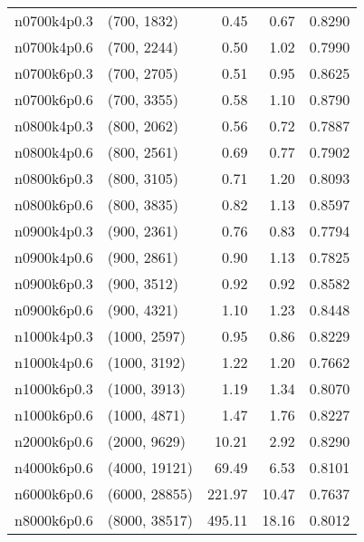 \begin{tabular}{llrrr}
n0700k4p0.3 &   (700, 1832) &      0.45 &     0.67 & 0.8290 \\
n0700k4p0.6 &   (700, 2244) &      0.50 &     1.02 & 0.7990 \\
n0700k6p0.3 &   (700, 2705) &      0.51 &     0.95 & 0.8625 \\
n0700k6p0.6 &   (700, 3355) &      0.58 &     1.10 & 0.8790 \\
n0800k4p0.3 &   (800, 2062) &      0.56 &     0.72 & 0.7887 \\
n0800k4p0.6 &   (800, 2561) &      0.69 &     0.77 & 0.7902 \\
n0800k6p0.3 &   (800, 3105) &      0.71 &     1.20 & 0.8093 \\
n0800k6p0.6 &   (800, 3835) &      0.82 &     1.13 & 0.8597 \\
n0900k4p0.3 &   (900, 2361) &      0.76 &     0.83 & 0.7794 \\
n0900k4p0.6 &   (900, 2861) &      0.90 &     1.13 & 0.7825 \\
n0900k6p0.3 &   (900, 3512) &      0.92 &     0.92 & 0.8582 \\
n0900k6p0.6 &   (900, 4321) &      1.10 &     1.23 & 0.8448 \\
n1000k4p0.3 &  (1000, 2597) &      0.95 &     0.86 & 0.8229 \\
n1000k4p0.6 &  (1000, 3192) &      1.22 &     1.20 & 0.7662 \\
n1000k6p0.3 &  (1000, 3913) &      1.19 &     1.34 & 0.8070 \\
n1000k6p0.6 &  (1000, 4871) &      1.47 &     1.76 & 0.8227 \\
n2000k6p0.6 &  (2000, 9629) &     10.21 &     2.92 & 0.8290 \\
n4000k6p0.6 & (4000, 19121) &     69.49 &     6.53 & 0.8101 \\
n6000k6p0.6 & (6000, 28855) &    221.97 &    10.47 & 0.7637 \\
n8000k6p0.6 & (8000, 38517) &    495.11 &    18.16 & 0.8012 \\
\bottomrule
\end{tabular}
